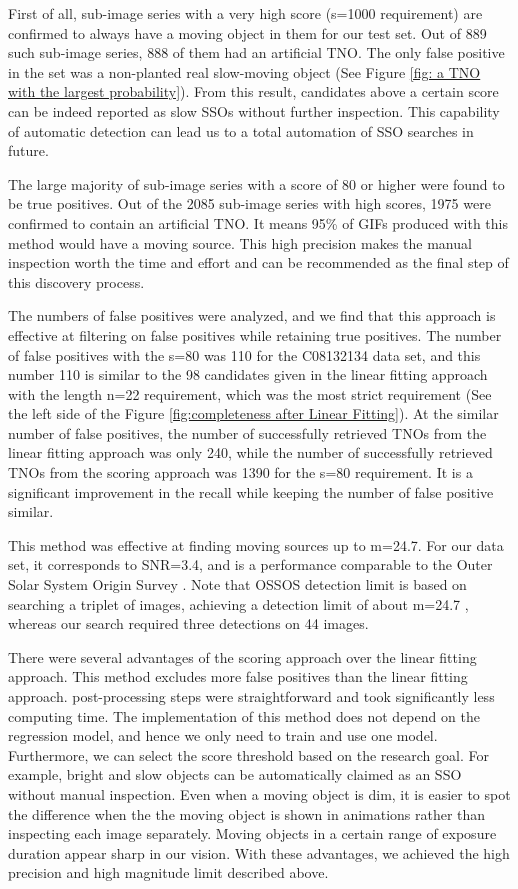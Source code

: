 \documentclass{aastex631}
\begin{document}
First of all, sub-image series with a very high score (s=1000 requirement) are confirmed to always have a moving object in them for our test set.
Out of 889 such sub-image series, 888 of them had an artificial TNO.
The only false positive in the set was a non-planted real slow-moving object (See Figure \ref{fig: a TNO with the largest probability}). 
From this result, candidates above a certain score can be indeed reported as slow SSOs without further inspection.
This capability of automatic detection can lead us to a total automation of SSO searches in future.

The large majority of sub-image series with a score of 80 or higher were found to be true positives.
Out of the 2085 sub-image series with high scores, 1975 were confirmed to contain an artificial TNO.
It means 95\% of GIFs produced with this method would have a moving source.
This high precision makes the manual inspection worth the time and effort and can be recommended as the final step of this discovery process.

The numbers of false positives were analyzed, and we find that this approach is effective at filtering on false positives while retaining true positives.
The number of false positives with the s=80 was 110 for the C08132134 data set, and this number 110 is similar to the 98 candidates given in the linear fitting approach with the length n=22 requirement, which was the most strict requirement (See the left side of the Figure \ref{fig:completeness after Linear Fitting}).
At the similar number of false positives, the number of successfully retrieved TNOs from the linear fitting approach was only 240, while the number of successfully retrieved TNOs from the scoring approach was 1390 for the s=80 requirement.
It is a significant improvement in the recall while keeping the number of false positive similar.

This method was effective at finding moving sources up to m=24.7.
For our data set, it corresponds to SNR=3.4, and is a performance comparable to the Outer Solar System Origin Survey \citep{2016AJ....152...70B}.
Note that OSSOS detection limit is based on searching a triplet of images, achieving a detection limit of about m=24.7 \citep{2018ApJS..236...18B}, whereas our search required three detections on 44 images.

There were several advantages of the scoring approach over the linear fitting approach.
This method excludes more false positives than the linear fitting approach.
post-processing steps were straightforward and took significantly less computing time.
The implementation of this method does not depend on the regression model, and hence we only need to train and use one model.
Furthermore, we can select the score threshold based on the research goal.
For example, bright and slow objects can be automatically claimed as an SSO without manual inspection.
Even when a moving object is dim, it is easier to spot the difference when the the moving object is shown in animations rather than inspecting each image separately.
Moving objects in a certain range of exposure duration appear sharp in our vision. \citep{1997Burr}
With these advantages, we achieved the high precision and high magnitude limit described above.
\end{document}

